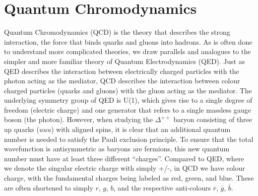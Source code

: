 \section{Quantum Chromodynamics}

  Quantum Chromodynamics (QCD) is the theory that describes the strong interaction, the force that binds quarks and gluons into hadrons. As is often done to understand more complicated theories, we draw parallels and analogues to the simpler and more familiar theory of Quantum Electrodynamics (QED). Just as QED describes the interaction between electrically charged particles with the photon acting as the mediator, QCD describes the interaction between colour charged particles (quarks and gluons) with the gluon acting as the mediator. The underlying symmetry group of QED is U(1), which gives rise to a single degree of freedom (electric charge) and one generator that refers to a single massless gauge boson (the photon). However, when studying the $\Delta^{++}$ baryon consisting of three up quarks ($uuu$) with aligned spins, it is clear that an additional quantum number is needed to satisfy the Pauli exclusion principle. To ensure that the total wavefunction is antisymmetric as baryons are fermions, this new quantum number must have at least three different ``charges''. Compared to QED, where we denote the singular electric charge with simply +/-, in QCD we have colour charge, with the fundamental charges being labeled as red, green, and blue. These are often shortened to simply $r$, $g$, $b$, and the respective anti-colours $\overline{r}$, $\overline{g}$, $\overline{b}$. 

